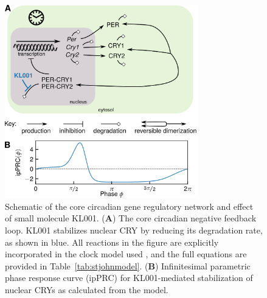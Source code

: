 \begin{figure}[p]
    \begin{center}
\includegraphics[width=8.4cm]{chap6/figures/figure_0.png}    %
\end{center}
\caption{Schematic of the core circadian gene regulatory network and effect of small molecule KL001.
		(\textbf{A}) The core circadian negative feedback loop. KL001 stabilizes nuclear CRY by reducing its degradation rate, as shown in blue. All reactions in the figure are explicitly incorporated in the clock model used \cite{StJohn2014b}, and the full equations are provided in Table~\ref{tab:stjohnmodel}.
		(\textbf{B}) Infinitesimal parametric phase response curve (ipPRC) for KL001-mediated stabilization of nuclear CRYs as calculated from the model.}  %
\label{fig:0}                                 %
\end{figure}


